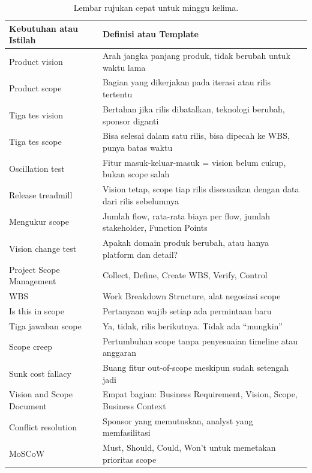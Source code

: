 \documentclass[11pt,a4paper]{article}
\begin{document}
\begin{table}[H]
	\centering
	\caption{Lembar rujukan cepat untuk minggu kelima.}
	\label{tab:cheat}
	\footnotesize
	\begin{tabularx}{\textwidth}{l X}
		\toprule
		Kebutuhan atau Istilah    & Definisi atau Template                                                       \\
		\midrule
		Product vision            & Arah jangka panjang produk, tidak berubah untuk waktu lama                   \\
		Product scope             & Bagian yang dikerjakan pada iterasi atau rilis tertentu                      \\
		Tiga tes vision           & Bertahan jika rilis dibatalkan, teknologi berubah, sponsor diganti           \\
		Tiga tes scope            & Bisa selesai dalam satu rilis, bisa dipecah ke WBS, punya batas waktu        \\
		Oscillation test          & Fitur masuk-keluar-masuk = vision belum cukup, bukan scope salah             \\
		Release treadmill         & Vision tetap, scope tiap rilis disesuaikan dengan data dari rilis sebelumnya \\
		Mengukur scope            & Jumlah flow, rata-rata biaya per flow, jumlah stakeholder, Function Points   \\
		Vision change test        & Apakah domain produk berubah, atau hanya platform dan detail?                \\
		Project Scope Management  & Collect, Define, Create WBS, Verify, Control                                 \\
		WBS                       & Work Breakdown Structure, alat negosiasi scope                               \\
		Is this in scope          & Pertanyaan wajib setiap ada permintaan baru                                  \\
		Tiga jawaban scope        & Ya, tidak, rilis berikutnya. Tidak ada ``mungkin''                           \\
		Scope creep               & Pertumbuhan scope tanpa penyesuaian timeline atau anggaran                   \\
		Sunk cost fallacy         & Buang fitur out-of-scope meskipun sudah setengah jadi                        \\
		Vision and Scope Document & Empat bagian: Business Requirement, Vision, Scope, Business Context          \\
		Conflict resolution       & Sponsor yang memutuskan, analyst yang memfasilitasi                          \\
		MoSCoW                    & Must, Should, Could, Won't untuk memetakan prioritas scope                   \\
		\bottomrule
	\end{tabularx}
\end{table}
\end{document}

